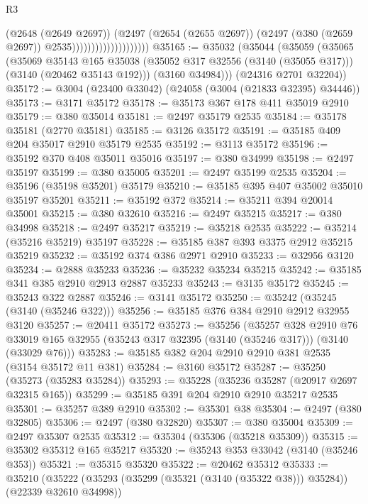 \begin{lexlean}{R3}
\begin{coremodule}
                                        (@2648 (@2649 @2697))
                                        (@2497
                                          (@2654 (@2655 @2697))
                                          (@2497 (@380 (@2659 @2697)) @2535))))))))))))))))))))
@35165 := @35032
    (@35044
      (@35059
        (@35065
          (@35069
            @35143
            @165
            @35038
            (@35052 @317 @32556 (@3140 (@35055 @317)))
            (@3140 (@20462 @35143 @192)))
          (@3160 @34984)))
      (@24316 @2701 @32204))
@35172 := @3004 (@23400 @33042) (@24058 (@3004 (@21833 @32395) @34446))
@35173 := @3171 @35172
@35178 := @35173 @367 @178 @411 @35019 @2910
@35179 := @380 @35014
@35181 := @2497 @35179 @2535
@35184 := @35178 @35181 (@2770 @35181)
@35185 := @3126 @35172
@35191 := @35185 @409 @204 @35017 @2910 @35179 @2535
@35192 := @3113 @35172
@35196 := @35192 @370 @408 @35011 @35016
@35197 := @380 @34999
@35198 := @2497 @35197
@35199 := @380 @35005
@35201 := @2497 @35199 @2535
@35204 := @35196 (@35198 @35201) @35179
@35210 := @35185 @395 @407 @35002 @35010 @35197 @35201
@35211 := @35192 @372
@35214 := @35211 @394 @20014 @35001
@35215 := @380 @32610
@35216 := @2497 @35215
@35217 := @380 @34998
@35218 := @2497 @35217
@35219 := @35218 @2535
@35222 := @35214 (@35216 @35219) @35197
@35228 := @35185 @387 @393 @3375 @2912 @35215 @35219
@35232 := @35192 @374 @386 @2971 @2910
@35233 := @32956 @3120
@35234 := @2888 @35233
@35236 := @35232 @35234 @35215
@35242 := @35185 @341 @385 @2910 @2913 @2887 @35233
@35243 := @3135 @35172
@35245 := @35243 @322 @2887
@35246 := @3141 @35172
@35250 := @35242 (@35245 (@3140 (@35246 @322)))
@35256 := @35185 @376 @384 @2910 @2912 @32955 @3120
@35257 := @20411 @35172
@35273 := @35256
    (@35257
      @328
      @2910
      @76
      @33019
      @165
      @32955
      (@35243 @317 @32395 (@3140 (@35246 @317)))
      (@3140 (@33029 @76)))
@35283 := @35185 @382 @204 @2910 @2910 @381 @2535 (@3154 @35172 @11 @381)
@35284 := @3160 @35172
@35287 := @35250 (@35273 (@35283 @35284))
@35293 := @35228 (@35236 @35287 (@20917 @2697 @32315 @165))
@35299 := @35185 @391 @204 @2910 @2910 @35217 @2535
@35301 := @35257 @389 @2910
@35302 := @35301 @38
@35304 := @2497 (@380 @32805)
@35306 := @2497 (@380 @32820)
@35307 := @380 @35004
@35309 := @2497 @35307 @2535
@35312 := @35304 (@35306 (@35218 @35309))
@35315 := @35302 @35312 @165 @35217
@35320 := @35243 @353 @33042 (@3140 (@35246 @353))
@35321 := @35315 @35320
@35322 := @20462 @35312
@35333 := @35210
    (@35222 (@35293 (@35299 (@35321 (@3140 (@35322 @38))) @35284)) (@22339 @32610 @34998))

\end{coremodule}
\end{lexlean}
